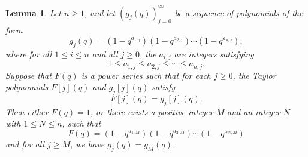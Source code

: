\documentclass[10pt,a4paper]{amsart}
\newtheorem{lemma}{Lemma}
\begin{document}
\begin{lemma}\label{lem:limit-of-quantum}
  Let $n \geq 1$, and let $(g_j(q))_{j=0}^\infty$ be a sequence of polynomials of the form
	\[
	g_j(q)
	=
	(1 - q^{a_{1,j}})
	(1 - q^{a_{2,j}})
	\cdots
	(1 - q^{a_{n,j}}),
	\]
	where for all $1 \leq i \leq n$ and all $j \geq 0$, the $a_{i,j}$ are integers satisfying \[ 1 \leq a_{1,j} \leq a_{2,j} \leq \cdots \leq a_{n,j}.\]
	Suppose that $F(q)$ is a power series such that for each $j \geq 0$, the Taylor polynomials $F[j](q)$ and $g_j[j](q)$ satisfy \[ F[j](q) = g_j[j](q).\] 
	Then either $F(q) = 1$, or there exists a positive integer $M$ and an integer $N$ with $1 \leq N \leq n$, such that 
	\[
	F(q) =
	(1 - q^{a_{1,M}})
	(1 - q^{a_{2,M}})
	\cdots
	(1 - q^{a_{N,M}})
	\]
	and for all $j \geq M$, we have $g_j(q) = g_M(q)$.
\end{lemma}
\end{document}
